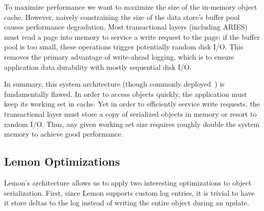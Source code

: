 \documentclass[10pt,letterpaper,twocolumn,english]{article}
\newcommand{\yad}{Lemon\xspace}
\begin{document}
To maximize performance we want to maximize the size of the in-memory object cache.
However, naively constraining the size of the data store's buffer pool
causes performance degradation. Most transactional layers 
(including ARIES) must read a page
into memory to service a write request to the page; if the buffer pool
is too small, these operations trigger potentially random disk I/O. 
This removes the primary
advantage of write-ahead logging, which is to ensure application data
durability with mostly sequential disk I/O.

In summary, this system architecture (though commonly
deployed~\cite{ejb,ordbms,jdo,...}) is fundamentally
flawed.  In order to access objects quickly, the application must keep
its working set in cache.  Yet in order to efficiently service write 
requests, the
transactional layer must store a copy of serialized objects
in memory or resort to random I/O.  
Thus, any given working set size requires roughly double the system
memory to achieve good performance.

\subsection{\yad Optimizations}

\label{version-pages}

\yad's architecture allows us to apply two interesting optimizations
to object serialization.  First, since \yad supports
custom log entries, it is trivial to have it store deltas to
the log instead of writing the entire object during an update.


\end{document}
